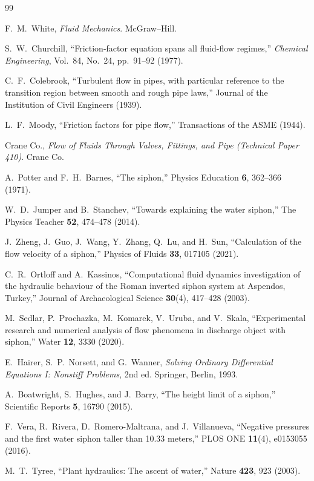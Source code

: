 \documentclass[11pt]{article}
\begin{document}
\begin{thebibliography}{99}

F.~M.~White,
\emph{Fluid Mechanics}.
McGraw--Hill.


S.~W.~Churchill,
``Friction-factor equation spans all fluid-flow regimes,''
\emph{Chemical Engineering}, Vol.~84, No.~24, pp.~91--92 (1977).


C.~F.~Colebrook,
``Turbulent flow in pipes, with particular reference to the transition region
between smooth and rough pipe laws,''
Journal of the Institution of Civil Engineers (1939).

L.~F.~Moody,
``Friction factors for pipe flow,''
Transactions of the ASME (1944).

Crane Co.,
\emph{Flow of Fluids Through Valves, Fittings, and Pipe (Technical Paper 410)}.
Crane Co.

A.~Potter and F.~H.~Barnes,
``The siphon,''
Physics Education \textbf{6}, 362--366 (1971).

W.~D.~Jumper and B.~Stanchev,
``Towards explaining the water siphon,''
The Physics Teacher \textbf{52}, 474--478 (2014).

J.~Zheng, J.~Guo, J.~Wang, Y.~Zhang, Q.~Lu, and H.~Sun,
``Calculation of the flow velocity of a siphon,''
Physics of Fluids \textbf{33}, 017105 (2021).

C.~R.~Ortloff and A.~Kassinos,
``Computational fluid dynamics investigation of the hydraulic behaviour of the Roman inverted siphon system at Aspendos, Turkey,''
Journal of Archaeological Science \textbf{30}(4), 417--428 (2003).

M.~Sedlar, P.~Prochazka, M.~Komarek, V.~Uruba, and V.~Skala,
``Experimental research and numerical analysis of flow phenomena in discharge object with siphon,''
Water \textbf{12}, 3330 (2020).

E.~Hairer, S.~P.~Norsett, and G.~Wanner,
\emph{Solving Ordinary Differential Equations I: Nonstiff Problems}, 2nd ed.
Springer, Berlin, 1993.

A.~Boatwright, S.~Hughes, and J.~Barry,
``The height limit of a siphon,''
Scientific Reports \textbf{5}, 16790 (2015).

F.~Vera, R.~Rivera, D.~Romero-Maltrana, and J.~Villanueva,
``Negative pressures and the first water siphon taller than 10.33 meters,''
PLOS ONE \textbf{11}(4), e0153055 (2016).

M.~T.~Tyree,
``Plant hydraulics: The ascent of water,''
Nature \textbf{423}, 923 (2003).

\end{thebibliography}
\end{document}
